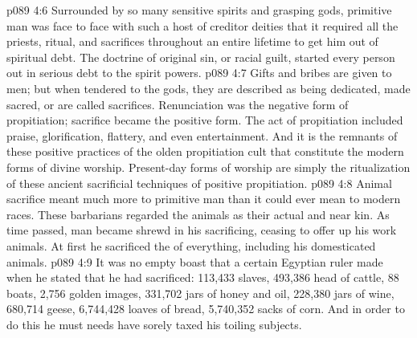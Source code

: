 \vs p089 4:6 Surrounded by so many sensitive spirits and grasping gods, primitive man was face to face with such a host of creditor deities that it required all the priests, ritual, and sacrifices throughout an entire lifetime to get him out of spiritual debt. The doctrine of original sin, or racial guilt, started every person out in serious debt to the spirit powers.
\vs p089 4:7 \pc Gifts and bribes are given to men; but when tendered to the gods, they are described as being dedicated, made sacred, or are called sacrifices. Renunciation was the negative form of propitiation; sacrifice became the positive form. The act of propitiation included praise, glorification, flattery, and even entertainment. And it is the remnants of these positive practices of the olden propitiation cult that constitute the modern forms of divine worship. Present\hyp{}day forms of worship are simply the ritualization of these ancient sacrificial techniques of positive propitiation.
\vs p089 4:8 \pc Animal sacrifice meant much more to primitive man than it could ever mean to modern races. These barbarians regarded the animals as their actual and near kin. As time passed, man became shrewd in his sacrificing, ceasing to offer up his work animals. At first he sacrificed the  of everything, including his domesticated animals.
\vs p089 4:9 It was no empty boast that a certain Egyptian ruler made when he stated that he had sacrificed: 113,433 slaves, 493,386 head of cattle, 88 boats, 2,756 golden images, 331,702 jars of honey and oil, 228,380 jars of wine, 680,714 geese, 6,744,428 loaves of bread, 5,740,352 sacks of corn. And in order to do this he must needs have sorely taxed his toiling subjects.
